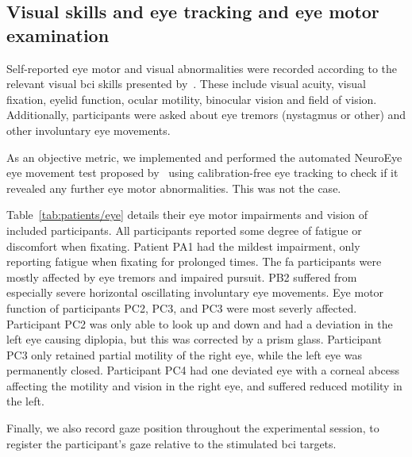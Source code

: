 \subsection{Visual skills and eye tracking and eye motor examination}

Self-reported eye motor and visual abnormalities were recorded according to the
relevant visual \ac{bci} skills presented by~\textcite{FriedOken2020}.
These include visual acuity, visual fixation, eyelid function, ocular motility,
binocular vision and field of vision.
Additionally, participants were asked about eye tremors (nystagmus or other) and
other involuntary eye movements.

As an objective metric, we implemented and performed the automated NeuroEye eye movement
test proposed by~\textcite{Hassan2022} using calibration-free eye tracking to
check if it revealed any further eye motor abnormalities.
This was not the case.

Table~\ref{tab:patients/eye} details their eye motor impairments and vision of
included participants.
All participants reported some degree of fatigue or discomfort when fixating.
Patient PA1 had the mildest impairment, only reporting fatigue when fixating
for prolonged times.
The \ac{fa} participants were mostly affected by eye tremors and impaired pursuit.
PB2 suffered from especially severe horizontal oscillating involuntary eye
movements.
Eye motor function of participants PC2, PC3, and PC3 were most severly affected.
Participant PC2 was only able to look up and down and had a deviation in the
left eye causing diplopia, but this was corrected by a prism glass.
Participant PC3 only retained partial motility of the right eye, while the left eye was permanently closed.
Participant PC4 had one deviated eye with a corneal abcess affecting the motility
and vision in the right eye, and suffered reduced motility in the left.

\begin{table}[t]
  \centering
  \footnotesize
  
  \caption[Visual skills of the included participants.]{%
  Visual skills of the included participants.
  Visual~\ac{bci} skills~\cite{FriedOken2020}
  were assessed with a combination of self-reported issues
  by the subject and the NeuroEye~\cite{Hassan2022} test. \BigCross\
  impaired, \BigDiamondshape\ severely impaired.
  logMAR: lower is better.}
  \label{tab:patients/eye}
\end{table}

Finally, we also record gaze position throughout the experimental session, to
register the participant's gaze relative to the stimulated \ac{bci} targets.

